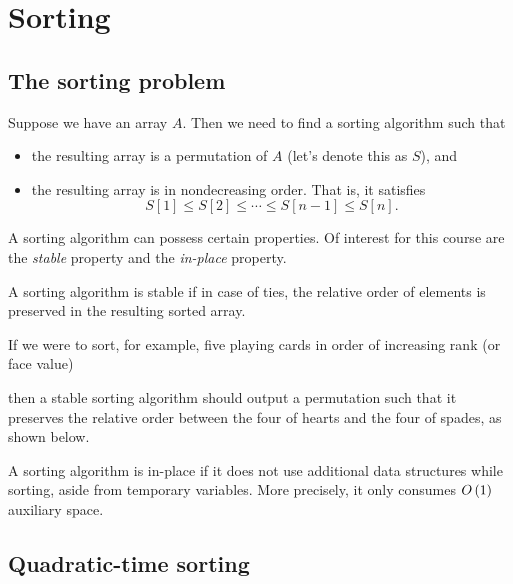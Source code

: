 \chapter{Sorting}
\label{chap:sorting}

\section{The sorting problem}
\begin{definition}
    Suppose we have an array $A$. Then we need to find a sorting algorithm such that
    \begin{itemize}
        \item the resulting array is a permutation of $A$ (let's denote this as $S$), and
        \item the resulting array is in nondecreasing order. That is, it satisfies
    \[
    S[1] \le S[2] \le \cdots \le S[n-1] \le S[n].
    \]
    \end{itemize}
\end{definition}

A sorting algorithm can possess certain properties. Of interest for this course are the \textit{stable} property and the \textit{in-place} property.

\begin{definition}
    A sorting algorithm is stable if in case of ties, the relative order of elements is preserved in the resulting sorted array.
\end{definition}

If we were to sort, for example, five playing cards in order of increasing rank (or face value)
\begin{center}
    \crdnines\crdQd\crdfourh\crdsixc\crdfours
\end{center}
then a stable sorting algorithm should output a permutation such that it preserves the relative order between the four of hearts and the four of spades, as shown below.
\begin{center}
    \crdfourh\crdfours\crdsixc\crdnines\crdQd
\end{center}

\begin{definition}
    A sorting algorithm is in-place if it does not use additional data structures while sorting, aside from temporary variables. More precisely, it only consumes $O\left(1 \right)$ auxiliary space.
\end{definition}

\section{Quadratic-time sorting}
